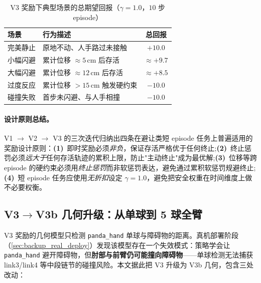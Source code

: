 \begin{table}[htbp]
  \centering
  \caption{V3 奖励下典型场景的总期望回报（$\gamma = 1.0$，$10$ 步 episode）}
  \label{tab:v3_returns}
  \footnotesize
  \begin{tabular}{@{}llc@{}}
    \toprule
    场景 & 行为描述 & 总回报 \\
    \midrule
    完美静止 & 原地不动、人手路过未接触 & $+10.0$ \\
    小幅闪避 & 累计位移 $\approx 5$\,cm 后存活 & $\approx +9.7$ \\
    大幅闪避 & 累计位移 $\approx 12$\,cm 后存活 & $\approx +8.5$ \\
    过度反应 & 累计位移 $> 15$\,cm 触发硬约束 & $-10.0$ \\
    碰撞失败 & 首步未闪避、与人手相撞 & $-10.0$ \\
    \bottomrule
  \end{tabular}
\end{table}

\paragraph{设计原则总结。}V1 $\to$ V2 $\to$ V3 的三次迭代归纳出四条在避让类短 episode 任务上普遍适用的奖励设计原则：\textbf{(1)}~即时奖励必须\emph{非负}，保证存活严格优于任何终止;\textbf{(2)}~终止惩罚必须\emph{远大于}任何存活轨迹的累积上限，防止"主动终止"成为最优解;\textbf{(3)}~位移等跨 episode 的硬约束必须用\emph{终止惩罚}而非软惩罚表达，避免通过累积软惩罚规避终止;\textbf{(4)}~短 episode 任务应使用\emph{无折扣}设定 $\gamma = 1.0$，避免把安全权重在时间维度上做不必要权衡。

\subsection{V3$\to$V3b 几何升级：从单球到 5 球全臂}\label{sec:v3b_geometry}

V3 奖励的几何模型只检测 \texttt{panda\_hand} 单球与障碍物的距离。真机部署阶段（\cref{sec:backup_real_deploy}）发现该模型存在一个失效模式：策略学会让 \texttt{panda\_hand} 避开障碍物，但\textbf{肘部与前臂仍可能撞向障碍物}——单球检测无法捕获 link3/link4 等中段链节的碰撞风险。本文据此把 V3 升级为 V3b 几何，包含三处改动：

